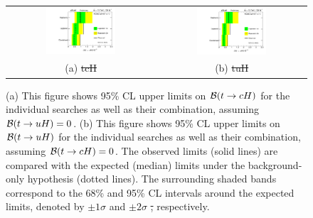 \documentclass[PAPER, coverpage, atlasdraft=true, texlive=2016, UKenglish]{\ATLASLATEXPATH atlasdoc}
\providecommand{\DIFadd}[1]{{\protect\color{blue}\uwave{#1}}} %
\providecommand{\DIFdel}[1]{{\protect\color{red}\sout{#1}}}                      %
\providecommand{\DIFaddFL}[1]{\DIFadd{#1}} %
\providecommand{\DIFdelFL}[1]{\DIFdel{#1}} %
\providecommand{\DIFaddbeginFL}{} %
\providecommand{\DIFaddendFL}{} %
\providecommand{\DIFdelbeginFL}{} %
\providecommand{\DIFdelendFL}{} %
\begin{document}
\begin{figure}[h!]
\begin{center}
\begin{tabular}{@{}cc@{}}
\includegraphics[width=0.49\textwidth]{figures/tcH_Limits.pdf}&
\includegraphics[width=0.49\textwidth]{figures/tuH_Limits.pdf}\\
(a) \DIFdelbeginFL \DIFdelFL{tcH }\DIFdelendFL \DIFaddbeginFL \DIFaddFL{$tcH$ }\DIFaddendFL & (b) \DIFdelbeginFL \DIFdelFL{tuH }\DIFdelendFL \DIFaddbeginFL \DIFaddFL{$tuH$ }\DIFaddendFL \\
\end{tabular}
\caption{\small {(a) This figure shows 95\% CL upper limits on $\mathcal{B}(t\to cH)$ for the individual searches as well as their
combination, assuming $\mathcal{B}(t\to uH)=0$. (b) This figure shows 95\% CL upper limits on $\mathcal{B}(t\to uH)$ for the individual searches as well as their
combination, assuming $\mathcal{B}(t\to cH)=0$. The observed limits (solid lines) are compared with the 
expected (median) limits under the background-only hypothesis (dotted lines). The surrounding shaded bands correspond to the 68\% and 95\% CL intervals around the expected limits, 
denoted by $\pm 1\sigma$ and $\pm 2\sigma$ \DIFdelbeginFL \DIFdelFL{, }\DIFdelendFL respectively.
}}
\label{fig:limits_combo_1D_hc} 
\end{center}
\end{figure}

\end{document}
